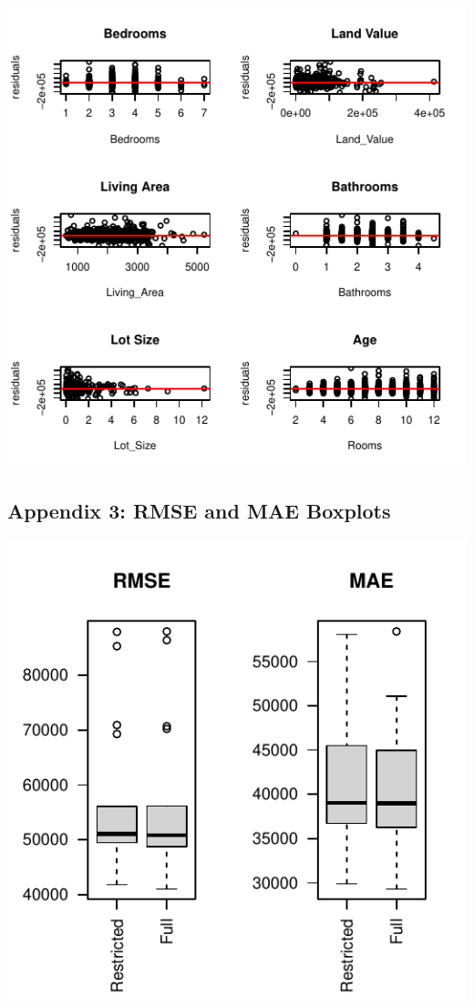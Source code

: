 \documentclass[letterpaper,9pt,twocolumn,twoside,]{pinp}
\begin{document}
\begin{center}\includegraphics{Report_files/figure-latex/unnamed-chunk-5-1} \end{center}

\hypertarget{appendix-3-rmse-and-mae-boxplots}{%
\subsection{\texorpdfstring{\textbf{Appendix 3: RMSE and MAE
Boxplots}}{Appendix 3: RMSE and MAE Boxplots}}\label{appendix-3-rmse-and-mae-boxplots}}

\begin{center}\includegraphics{Report_files/figure-latex/unnamed-chunk-6-1} \end{center}
\end{document}
